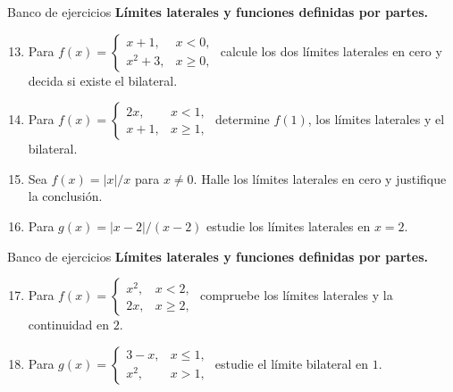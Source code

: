 \documentclass[12pt,aspectratio=169]{beamer}
\begin{document}
\begin{frame}[t,allowframebreaks]{Banco de ejercicios}
\small
\noindent \textbf{Límites laterales y funciones definidas por partes.}\par\smallskip
\begin{enumerate}\setcounter{enumi}{12}
\item Para $f(x)=\begin{cases}x+1,&x<0,\\x^2+3,&x\ge0,\end{cases}$ calcule los dos límites laterales en cero y decida si existe el bilateral.
\item Para $f(x)=\begin{cases}2x,&x<1,\\x+1,&x\ge1,\end{cases}$ determine $f(1)$, los límites laterales y el bilateral.
\item Sea $f(x)=|x|/x$ para $x\ne0$. Halle los límites laterales en cero y justifique la conclusión.
\item Para $g(x)=|x-2|/(x-2)$ estudie los límites laterales en $x=2$.
\end{enumerate}
\end{frame}


\begin{frame}[t,allowframebreaks]{Banco de ejercicios}
\small
\noindent \textbf{Límites laterales y funciones definidas por partes.}\par\smallskip
\begin{enumerate}\setcounter{enumi}{16}
\item Para $f(x)=\begin{cases}x^2,&x<2,\\2x,&x\ge2,\end{cases}$ compruebe los límites laterales y la continuidad en $2$.
\item Para $g(x)=\begin{cases}3-x,&x\le1,\\x^2,&x>1,\end{cases}$ estudie el límite bilateral en $1$.
\end{enumerate}
\end{frame}
\end{document}
